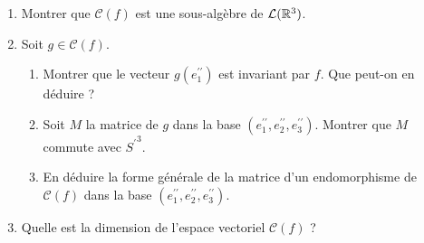 \begin{enumerate}
\begin{enumerate}
 \item Montrer que $\mathcal{C}(f)$ est une sous-algèbre de $\mathcal{L}(\mathbb{R}^3)$.
\item Soit $g\in\mathcal{C}(f)$.
\begin{enumerate}
 \item Montrer que le vecteur $g(e^{\prime\prime}_1)$ est invariant par $f$. Que peut-on en déduire ?
\item Soit $M$ la matrice de $g$ dans la base $(e^{\prime\prime}_1, e^{\prime\prime}_2, e^{\prime\prime}_3)$. Montrer que $M$ commute avec ${S^\prime}^3$.
\item En déduire la forme générale de la matrice d'un endomorphisme de $\mathcal{C}(f)$ dans la base $(e^{\prime\prime}_1, e^{\prime\prime}_2, e^{\prime\prime}_3)$.
\end{enumerate}
\item Quelle est la dimension de l'espace vectoriel $\mathcal{C}(f)$ ?
\end{enumerate}

\end{enumerate}

